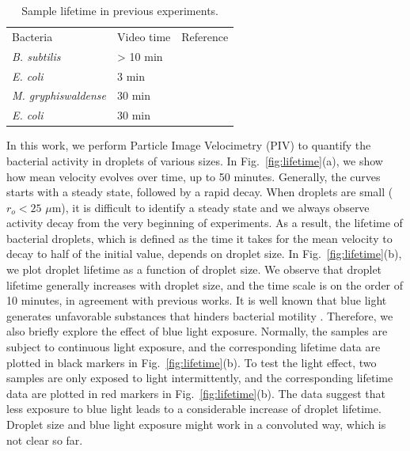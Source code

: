 \documentclass[%
10pt,
superscriptaddress,
twocolumn,
 amsmath,amssymb,
 aps,prx,
]{revtex4-2}
\newcommand{\ecoli}[0]{\textit{E. coli}} %
\begin{document}
\begin{table}
  \caption{\label{tab:sample-lifetime}Sample lifetime in previous experiments.}
  \begin{ruledtabular}
  \begin{tabular}{lll}
  Bacteria & Video time & Reference \\
  \textit{B. subtilis} & > 10 min & \cite{Wioland2013} \\
  \ecoli & 3 min & \cite{Hamby2018} \\
  \textit{M. gryphiswaldense} & 30 min & \cite{Vincenti2019} \\
  \ecoli & 30 min & \cite{Rajabi2021} \\
  \end{tabular}
  \end{ruledtabular}
\end{table}

In this work, we perform Particle Image Velocimetry (PIV) to quantify the bacterial activity in droplets of various sizes. 
In Fig.~\ref{fig:lifetime}(a), we show how mean velocity evolves over time, up to 50 minutes. 
Generally, the curves starts with a steady state, followed by a rapid decay.
When droplets are small ($r_o<25$ $\mu$m), it is difficult to identify a steady state and we always observe activity decay from the very beginning of experiments.
As a result, the lifetime of bacterial droplets, which is defined as the time it takes for the mean velocity to decay to half of the initial value, depends on droplet size. 
In Fig.~\ref{fig:lifetime}(b), we plot droplet lifetime as a function of droplet size. 
We observe that droplet lifetime generally increases with droplet size, and the time scale is on the order of 10 minutes, in agreement with previous works. 
It is well known that blue light generates unfavorable substances that hinders bacterial motility \cite{bergColiMotion2004}.
Therefore, we also briefly explore the effect of blue light exposure. 
Normally, the samples are subject to continuous light exposure, and the corresponding lifetime data are plotted in black markers in Fig.~\ref{fig:lifetime}(b).
To test the light effect, two samples are only exposed to light intermittently, and the corresponding lifetime data are plotted in red markers in Fig.~\ref{fig:lifetime}(b).
The data suggest that less exposure to blue light leads to a considerable increase of droplet lifetime.
Droplet size and blue light exposure might work in a convoluted way, which is not clear so far.
\end{document}
